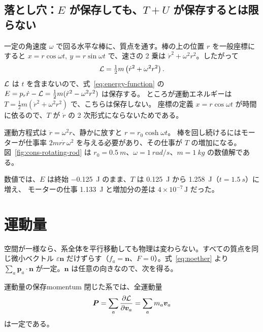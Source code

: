 \subsection*{落とし穴：$E$ が保存しても、$T+U$ が保存するとは限らない}

一定の角速度 $\omega$ で回る水平な棒に、質点を通す。棒の上の位置 $r$ を一般座標にすると
$x=r\cos\omega t,\ y=r\sin\omega t$ で、速さの 2 乗は $\dot r^2+\omega^2r^2$。したがって
\begin{equation}
  \mathcal{L}=\tfrac12m\left(\dot r^2+\omega^2r^2\right).
\end{equation}
$\mathcal{L}$ は $t$ を含まないので、式~\eqref{eq:energy-function} の
$E=p_r\dot r-\mathcal{L}=\tfrac12m(\dot r^2-\omega^2r^2)$ は保存する。
ところが運動エネルギーは $T=\tfrac12m(\dot r^2+\omega^2r^2)$ で、こちらは保存しない。
座標の定義 $x=r\cos\omega t$ が時間に依るので、$T$ が $\dot r$ の 2 次形式にならないためである。

運動方程式は $\ddot r=\omega^2r$、静かに放すと $r=r_0\cosh\omega t$。
棒を回し続けるにはモーターが仕事率 $2mr\dot r\,\omega^2$ を与える必要があり、その仕事が $T$ の増加になる。
図~\ref{fig:cons-rotating-rod} は $r_0=\qty{0.5}{m}$、$\omega=\qty{1}{rad/s}$、$m=\qty{1}{kg}$ の数値解である。


数値では、$E$ は終始 \qty{-0.125}{J} のまま、$T$ は \qty{0.125}{J} から \qty{1.258}{J}（$t=\qty{1.5}{s}$）に増え、
モーターの仕事 \qty{1.133}{J} と増加分の差は $4\times10^{-7}\,\mathrm{J}$ だった。

\section{運動量}\label{sec:cons-momentum}

空間が一様なら、系全体を平行移動しても物理は変わらない。すべての質点を同じ微小ベクトル
$\varepsilon\bm n$ だけずらす（$f_a=\bm n$、$F=0$）。式~\eqref{eq:noether} より
$\sum_a\bm p_a\cdot\bm n$ が一定。$\bm n$ は任意の向きなので、次を得る。

\begin{result}{運動量の保存}{momentum}
閉じた系では、全運動量
\begin{equation}
  \bm P=\sum_a\frac{\partial \mathcal{L}}{\partial \bm v_a}=\sum_am_a\bm v_a
\end{equation}
は一定である。
\end{result}

